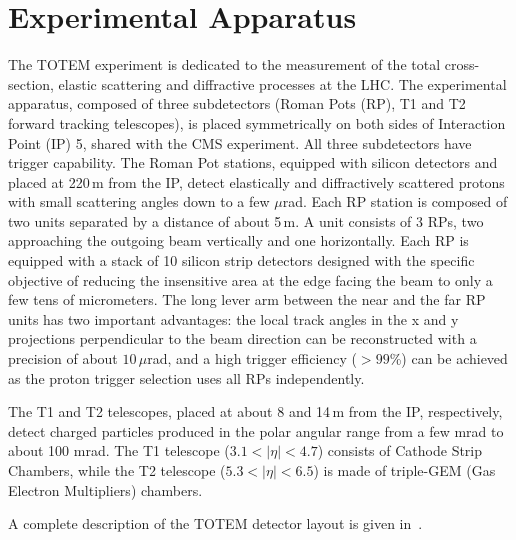 \section{Experimental Apparatus}
%
The TOTEM experiment is dedicated to the measurement of the total 
cross-section, elastic scattering
and diffractive processes at the LHC. The experimental
apparatus, composed of three subdetectors
(Roman Pots (RP), T1 and T2 forward tracking telescopes), 
is placed symmetrically on both sides of Interaction Point (IP) 5, shared
with the CMS experiment. All three subdetectors have
trigger capability. The Roman Pot stations, equipped with
silicon detectors and placed at 220\,m from the IP,
detect elastically and diffractively scattered protons with
small scattering angles down to a few $\mu$rad. 
Each RP station is composed of two units separated
by a distance of about 5\,m. A unit consists of 3 RPs, two
approaching the outgoing beam vertically and one horizontally.
Each RP is equipped with a stack of 10 silicon
strip detectors designed with the specific objective of
reducing the insensitive area at the edge facing the beam
to only a few tens of micrometers. The long lever arm
between the near and the far RP units has two important
advantages: the local track angles in the x and y projections
perpendicular to the beam direction can be reconstructed
with a precision of about $10\,\mu$rad, and a high trigger efficiency
($> 99$\%) can be achieved as the proton trigger selection
uses all RPs independently.

The T1 and T2 telescopes, placed at about 8 and 14\,m from the IP, 
respectively, detect charged particles produced in the polar
angular range from a few mrad to about 100 mrad. The T1 telescope
($3.1 < |\eta| < 4.7$) consists of Cathode Strip Chambers,
while the T2 telescope ($5.3 < |\eta| < 6.5$) is made of
triple-GEM (Gas Electron Multipliers) chambers.

A complete description of the TOTEM detector layout is given in~\cite{jinst}.

